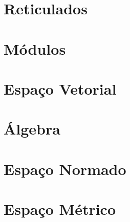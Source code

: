 \documentclass[twoside]{amsart}
\numberwithin{equation}{section}
\begin{document}


\section{Reticulados}



\section{Módulos}



\section{Espaço Vetorial}



\section{Álgebra}



\section{Espaço Normado}



\section{Espaço Métrico}


\end{document}
